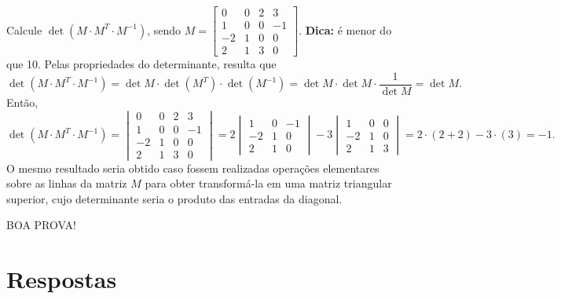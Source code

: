 \documentclass[12pt,a4paper]{article}
\begin{document}
\begin{ExerciseList}
\Exercise[title={2,5}] Calcule $\det{(M \cdot M^T \cdot M^{-1})}$, sendo
$M = \begin{bmatrix}
 0 & 0 & 2 &  3\\
 1 & 0 & 0 & -1\\
-2 & 1 & 0 &  0\\
 2 & 1 & 3 &  0
\end{bmatrix}$. \textbf{Dica:} é menor do que 10.
\Answer Pelas propriedades do determinante, resulta que
\[
\det{(M \cdot M^T \cdot M^{-1})}
=\det{M} \cdot \det{(M^T)} \cdot \det{(M^{-1})}
=\det{M} \cdot \det{M} \cdot \frac{1}{\det{M}}
=\det{M}.
\]
Então,
\[
\det{(M \cdot M^T \cdot M^{-1})}
= \begin{vmatrix}
 0 & 0 & 2 &  3\\
 1 & 0 & 0 & -1\\
-2 & 1 & 0 &  0\\
 2 & 1 & 3 &  0
\end{vmatrix}
=2
 \begin{vmatrix}
 1 & 0 & -1\\
-2 & 1 &  0\\
 2 & 1 &  0
\end{vmatrix}
-3
 \begin{vmatrix}
 1 & 0 & 0\\
-2 & 1 & 0\\
 2 & 1 & 3
\end{vmatrix}
=2\cdot (2+2)-3\cdot(3)
=-1.
\]
O mesmo resultado seria obtido caso fossem realizadas operações elementares sobre as linhas da matriz $M$ para obter transformá-la em uma matriz triangular superior, cujo determinante seria o produto das entradas da diagonal.

\end{ExerciseList}

\begin{center}
BOA PROVA!
\end{center}

\newpage
\restoregeometry
\section*{Respostas}
\shipoutAnswer
\end{document}
